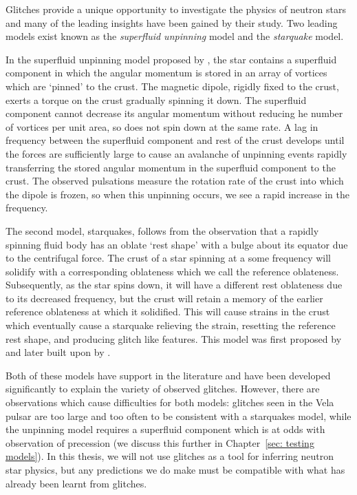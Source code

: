 Glitches provide a unique opportunity to investigate the physics of neutron
stars and many of the leading insights have been gained by their study. Two
leading models exist known as the \emph{superfluid unpinning} model and the
\emph{starquake} model.

In the superfluid unpinning model proposed by \citet{Anderson1975}, the star
contains a superfluid component in which the angular momentum is stored in an
array of vortices which are `pinned' to the crust. The magnetic dipole, rigidly
fixed to the crust, exerts a torque on the crust gradually spinning it down.
The superfluid component cannot decrease its angular momentum without
reducing he number of vortices per unit area, so does not spin down at the
same rate. A lag in frequency between the superfluid
component and rest of the crust develops until the forces are sufficiently
large to cause an avalanche of unpinning events rapidly transferring the stored
angular momentum in the superfluid component to the crust. The observed
pulsations measure the rotation rate of the crust into which the dipole is
frozen, so when this unpinning occurs, we see a rapid increase in the
frequency.

The second model, starquakes, follows from the observation that a rapidly
spinning fluid body has an oblate `rest shape' with a bulge about its equator
due to the centrifugal force. The crust of a star spinning at a some frequency
will solidify with a corresponding oblateness which we call the reference
oblateness. Subsequently, as the star spins down, it will have a different rest
oblateness due to its decreased frequency, but the crust will retain a memory
of the earlier reference oblateness at which it solidified. This will cause
strains in the crust which eventually cause a starquake relieving the strain,
resetting the reference rest shape, and producing glitch like features. This
model was first proposed by \citet{Ruderman1969} and later built upon by
\citet{Baym1971}.

Both of these models have support in the literature and have been developed
significantly to explain the variety of observed glitches. However, there are
observations which cause difficulties for both models: glitches seen in the
Vela pulsar are too large and too often to be consistent with a starquakes
model, while the unpinning model requires a superfluid component which is at
odds with observation of precession (we discuss this further in
Chapter~\ref{sec: testing models}). In this thesis, we will not use glitches
as a tool for inferring neutron star physics, but any predictions we do make
must be compatible with what has already been learnt from glitches.


